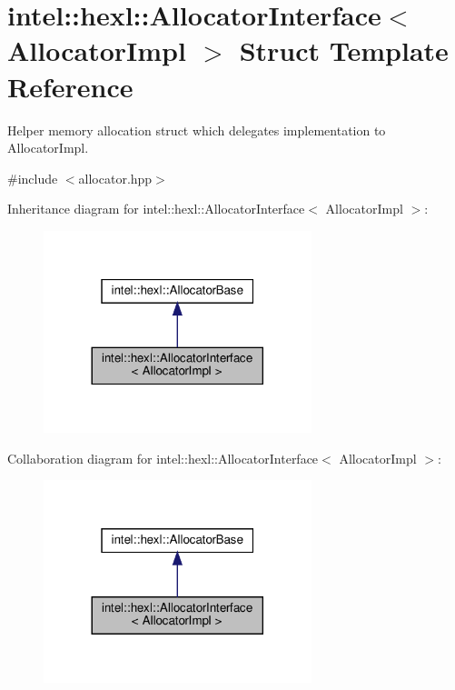 \hypertarget{structintel_1_1hexl_1_1AllocatorInterface}{}\section{intel\+:\+:hexl\+:\+:Allocator\+Interface$<$ Allocator\+Impl $>$ Struct Template Reference}
\label{structintel_1_1hexl_1_1AllocatorInterface}


Helper memory allocation struct which delegates implementation to Allocator\+Impl.  




{\ttfamily \#include $<$allocator.\+hpp$>$}



Inheritance diagram for intel\+:\+:hexl\+:\+:Allocator\+Interface$<$ Allocator\+Impl $>$\+:
\nopagebreak
\begin{figure}[H]
\begin{center}
\leavevmode
\includegraphics[width=221pt]{structintel_1_1hexl_1_1AllocatorInterface__inherit__graph}
\end{center}
\end{figure}


Collaboration diagram for intel\+:\+:hexl\+:\+:Allocator\+Interface$<$ Allocator\+Impl $>$\+:
\nopagebreak
\begin{figure}[H]
\begin{center}
\leavevmode
\includegraphics[width=221pt]{structintel_1_1hexl_1_1AllocatorInterface__coll__graph}
\end{center}
\end{figure}
